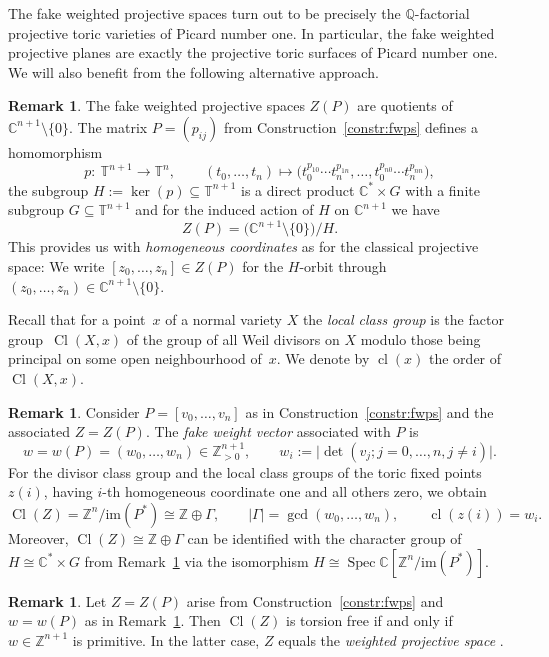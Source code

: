 \documentclass[10pt,a4paper]{amsart}
\theoremstyle{definition}
\newtheorem{rem}[thm]{Remark}
\def\CC{{\mathbb C}}
\def\TT{{\mathbb T}}
\def\ZZ{{\mathbb Z}}
\def\QQ{{\mathbb Q}}
\def\PP{{\mathbb P}}
\DeclareMathOperator{\Cl}{Cl}
\DeclareMathOperator{\cl}{cl}
\DeclareMathOperator{\Spec}{Spec}
\begin{document}
The fake weighted projective spaces turn out to be
precisely the $\QQ$-factorial projective toric
varieties of Picard number one.
In particular, the fake weighted projective
planes are exactly the projective toric surfaces
of Picard number one.
We will also benefit from the following alternative
approach.

\begin{rem}\label{rem:fwpsasquots}
The fake weighted projective spaces $Z(P)$ are quotients
of $\CC^{n+1} \setminus \{0\}$. The matrix $P=(p_{ij})$
from Construction~\ref{constr:fwps} defines a homomorphism
\[
p \colon \ \TT^{n+1} \to \TT^n,
\qquad
(t_0,\dots,t_n)
 \mapsto
\bigl(t_0^{p_{10}} \cdots t_n^{p_{1n}}, \dots , t_0^{p_{n0}} \cdots t_n^{p_{nn}}\bigr),
\]
the subgroup $H := \ker(p) \subseteq \TT^{n+1}$ is a
direct product $\CC^* \times G$ with a finite
subgroup $G \subseteq \TT^{n+1}$ and for the
induced action of $H$ on $\CC^{n+1}$ we have
\[
Z(P) = \bigl(\CC^{n+1} \setminus\{0\}\bigr) / H.
\]
This provides us with \emph{homogeneous coordinates}
as for the classical projective space:
We write $[z_0,\dots, z_n] \in Z(P)$ for the
$H$-orbit through
$(z_0,\dots, z_n) \in \CC^{n+1} \setminus \{0\}$.
\end{rem}


Recall that for a point~$x$ of a normal variety $X$
the \emph{local class group} is the factor group~$\Cl(X,x)$
of the group of all Weil divisors on $X$
modulo those being principal on some open
neighbourhood of~$x$. We denote by $\cl(x)$ the
order of $\Cl(X,x)$.


\begin{rem}
\label{rem:fakewv}
Consider $P = [v_0, \dots, v_n]$ as in
Construction~\ref{constr:fwps} and
the associated $Z=Z(P)$.
The \emph{fake weight vector} associated
with $P$ is
\[
w
=
w(P)
=
(w_0,\dots,w_n)
\in
\ZZ_{>0}^{n+1},
\qquad
w_i := \vert {\det}(v_j; j = 0,\dots,n, j \ne i) \vert.
\]
For the divisor class group and the local class groups
of the toric fixed points $z(i)$, having $i$-th
homogeneous coordinate one and all others zero,
we obtain
\[
\Cl(Z) = \ZZ^n / \mathrm{im}(P^*) \cong \ZZ \oplus \Gamma,
\qquad
\vert \Gamma \vert = \gcd(w_0,\dots,w_n),
\qquad
\cl(z(i)) = w_i.
\]
Moreover, $\Cl(Z) \cong \ZZ \oplus \Gamma$ can
be identified with the character group of
$H \cong \CC^* \times G$ from
Remark~\ref{rem:fwpsasquots} via the isomorphism
$H \cong \Spec \CC[\ZZ^n / \mathrm{im}(P^*)]$.
\end{rem}

\begin{rem}Let $Z=Z(P)$ arise from Construction~\ref{constr:fwps}
and $w = w(P)$ as in Remark~\ref{rem:fakewv}.
Then $\Cl(Z)$ is torsion free if and
only if $w \in \ZZ^{n+1}$ is primitive.
In the latter case, $Z$ equals the
\emph{weighted projective space}
\smash{$\PP_{(w_0, \dots, w_n)}$}.
\end{rem}
\end{document}
